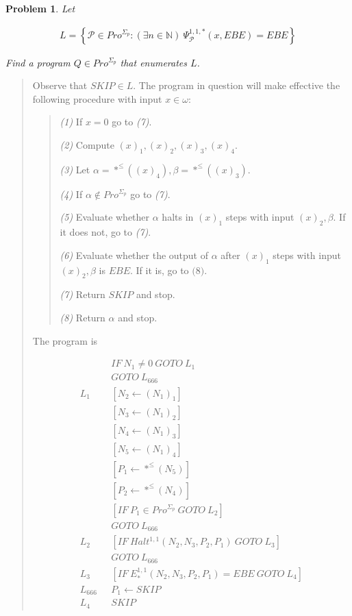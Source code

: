 \documentclass[a4paper, 12pt]{article}
\newtheorem{problem}{Problem}
\newtheorem{problem}{Problem}
\begin{document}
\pagebreak 

\begin{problem}
    Let  

    \begin{align*}
        L = \left\{ \mathcal{P} \in Pro^{\Sigma_p} : \left( \exists n \in
        \mathbb{N} \right) ~ \Psi_{\mathcal{P}}^{1, 1, *}(x, EBE) = EBE  \right\} 
    \end{align*}

    Find a program $Q \in Pro^{\Sigma_p}$ that enumerates $L$.
\end{problem}


\small
\begin{quote}

Observe that $SKIP \in L$. The program in question will make effective the
following procedure with input $x \in \omega$: 

\begin{quote}
    \textit{(1)} If $x = 0$ go to \textit{(7)}. 
    
    \textit{(2)} Compute $(x)_1, (x)_2, (x)_3, (x)_4$.

    \textit{(3)} Let $\alpha = *^{\leq}\left( \left( x \right)_4  \right), \beta
    = *^{\leq}\left( (x)_3 \right) $. 

    \textit{(4)} If $\alpha \not\in Pro^{\Sigma_p}$ go to \textit{(7)}. 

    \textit{(5)} Evaluate whether $\alpha$ halts in $(x)_1$ steps with input
    $(x)_2, \beta$. If it does not, go to \textit{(7)}. 

    \textit{(6)} Evaluate whether the output of $\alpha$ after $(x)_1$ steps
    with input $(x)_2, \beta$ is $EBE$. If it is, go to $\textit{(8)}$.

    \textit{(7)} Return $SKIP$ and stop. 

    \textit{(8)} Return $\alpha$ and stop.
\end{quote}

The program is 

\begin{align*}
    &IF ~ N_1 \neq 0 ~ GOTO ~ L_1 \\ 
    &GOTO ~ L_{666} \\ 
    L_1 ~ ~ ~ &[N_2 \leftarrow (N_1)_1] \\ 
    &[N_3 \leftarrow (N_1)_2]\\
    &[N_4 \leftarrow (N_1)_3]\\
    &[N_5 \leftarrow (N_1)_4] \\ 
    &[P_1 \leftarrow *^{\leq}(N_5)]\\
    &[P_2 \leftarrow *^{\leq}(N_4)]\\
    &[IF ~ P_1 \in Pro^{\Sigma_p} ~ GOTO ~ L_2] \\ 
    &GOTO ~ L_{666} \\ 
    L_2 ~ ~ ~ &[IF ~ Halt^{1, 1}(N_2, N_3, P_2, P_1) ~ GOTO ~ L_3] \\ 
              &GOTO ~ L_{666} \\ 
    L_3 ~ ~ ~ &[IF ~  E_{*}^{1, 1}\left( N_2, N_3, P_2, P_1 \right) = EBE ~ GOTO ~
    L_4] \\ 
    L_{666}~ ~ ~& P_1 \leftarrow  SKIP \\
    L_4 ~ ~ ~ &SKIP
\end{align*}


\end{quote}
\end{document}
